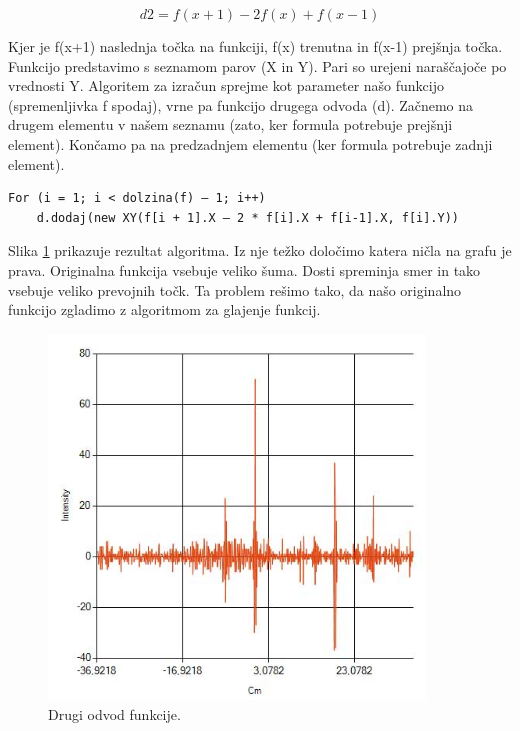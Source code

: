 \documentclass[oneside, a4paper, 12pt]{book}
\begin{document}
\begin{equation}
d2=f(x+1) - 2f(x) + f(x-1)
\label{eq:d2}
\end{equation}

Kjer je f(x+1) naslednja točka na funkciji, f(x) trenutna in f(x-1) prejšnja točka. Funkcijo predstavimo s seznamom parov (X in Y). Pari so urejeni naraščajoče po vrednosti Y. Algoritem za izračun sprejme kot parameter našo funkcijo (spremenljivka f spodaj), vrne pa funkcijo drugega odvoda (d). Začnemo na drugem elementu v našem seznamu (zato, ker formula potrebuje prejšnji element). Končamo pa na predzadnjem elementu (ker formula potrebuje zadnji element).

\begin{verbatim}
For (i = 1; i < dolzina(f) – 1; i++) 
    d.dodaj(new XY(f[i + 1].X – 2 * f[i].X + f[i-1].X, f[i].Y))
\end{verbatim}

Slika \ref{pic:d2} prikazuje rezultat algoritma. Iz nje težko določimo katera ničla na grafu je prava. Originalna funkcija vsebuje veliko šuma. Dosti spreminja smer in tako vsebuje veliko prevojnih točk. Ta problem rešimo tako, da našo originalno funkcijo zgladimo z algoritmom za glajenje funkcij.


\begin{figure}
\begin{center}
\includegraphics[width=10cm]{slike/drugi-odvod-1.jpg}
\end{center}
\caption{Drugi odvod funkcije.}
\label{pic:d2}
\end{figure}
\end{document}
